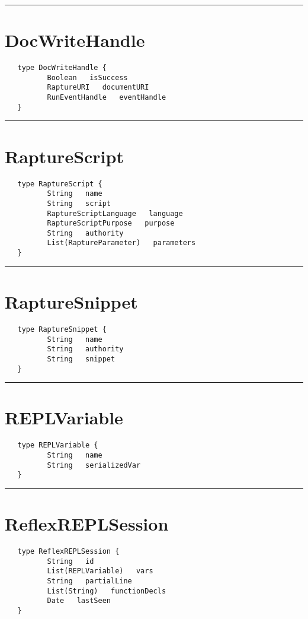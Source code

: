 \rule{15cm}{2pt}
\section{DocWriteHandle}
\label{type:DocWriteHandle}

\begin{verbatim}
   type DocWriteHandle {
          Boolean   isSuccess
          RaptureURI   documentURI
          RunEventHandle   eventHandle
   }
\end{verbatim}

\rule{15cm}{2pt}
\section{RaptureScript}
\label{type:RaptureScript}

\begin{verbatim}
   type RaptureScript {
          String   name
          String   script
          RaptureScriptLanguage   language
          RaptureScriptPurpose   purpose
          String   authority
          List(RaptureParameter)   parameters
   }
\end{verbatim}

\rule{15cm}{2pt}
\section{RaptureSnippet}
\label{type:RaptureSnippet}

\begin{verbatim}
   type RaptureSnippet {
          String   name
          String   authority
          String   snippet
   }
\end{verbatim}

\rule{15cm}{2pt}
\section{REPLVariable}
\label{type:REPLVariable}

\begin{verbatim}
   type REPLVariable {
          String   name
          String   serializedVar
   }
\end{verbatim}

\rule{15cm}{2pt}
\section{ReflexREPLSession}
\label{type:ReflexREPLSession}

\begin{verbatim}
   type ReflexREPLSession {
          String   id
          List(REPLVariable)   vars
          String   partialLine
          List(String)   functionDecls
          Date   lastSeen
   }
\end{verbatim}

